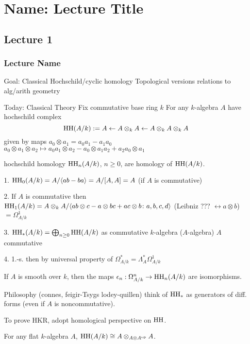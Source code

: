 \newpage
\section{Name: Lecture Title}
\subsection{Lecture 1}
\subsubsection{Lecture Name}

Goal: Classical Hochschild/cyclic homology
Topological versions
relations to alg/arith geometry

Today: Classical Theory
Fix commutative base ring $k$
For any $k$-algebra $A$ have hochschild complex
	\[
	\operatorname{HH}(A/k):= A \leftarrow A \otimes_k A \leftarrow A \otimes_k A \otimes_k A
	\]
given by maps $a_0 \otimes a_1= a_0 a_1 - a_1a_0$
$a_0 \otimes a_1 \otimes a_2 \mapsto a_0a_1 \otimes a_2 - a_0 \otimes a_1a_2 + a_2 a_0 \otimes a_1$



hochschild homology $\operatorname{HH}_n(A/k)$, $n\geq 0$, are homology of $\operatorname{HH}(A/k)$.

1. $\operatorname{HH}_0(A/k)= A/\langle ab-ba \rangle= A/[A,A]= A$ (if $A$ is commutative)

2. If $A$ is commutative then $\operatorname{HH}_1(A/k)= A \otimes_k A / \langle ab \otimes c - a \otimes bc + ac \otimes b \colon a,b,c,d \rangle$ (Leibniz ??? $\leftrightarrow a \otimes b$)$= \Omega_{A/k}^1$

3. $\operatorname{HH}_*(A/k)= \bigoplus_{n \geq 0} \operatorname{HH}(A/k)$ as commutative $k$-algebra ($A$-algebra)
$A$ commutative

4. 1.-s. then by universal property of $\Omega_{A/k}^*= \Lambda_A^* \Omega_{A/k}^1$


\begin{thm}
If $A$ is smooth over $k$, then the maps $\epsilon_n: \Omega_{A/k}^n \to \operatorname{HH}_n(A/k)$ are isomorphisms.
\end{thm}

Philosophy (connes, feigir-Tsygs lodey-quillen) think of $\operatorname{HH}_*$ as generators of diff. forms (even if $A$ is noncommutative).


To prove HKR, adopt homological perspective on $\operatorname{HH}$.

\begin{lem}
For any flat $k$-algebra $A$, $\operatorname{HH}(A/k) \cong A \otimes_{A \otimes A^\text{op}} A$.
\end{lem}

